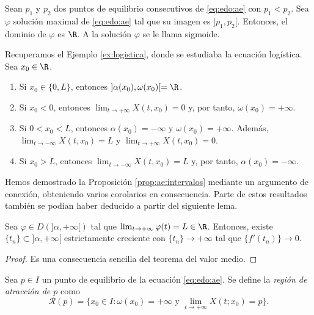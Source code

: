 \documentclass{article}
\begin{document}
\begin{cor}
  Sean $p_1$ y $p_2$ dos puntos de equilibrio consecutivos de \eqref{eq:edo:ae} con $p_1 < p_2$. Sea
  $\varphi$ solución maximal de \eqref{eq:edo:ae} tal que su imagen es $]p_1, p_2[$. Entonces, el
  dominio de $\varphi$ es $\R$. A la solución $\varphi$ se le llama sigmoide.
\end{cor}

\begin{ex} \label{ex:logistica:2} Recuperamos el Ejemplo \ref{ex:logistica},
  donde se estudiaba la ecuación logística. Sea $x_0 \in \R$.
  \begin{enumerate}
  \item Si $x_0 \in \{0, L\}$, entonces $]\alpha(x_0), \omega(x_0)[ = \R$.
  \item Si $x_0 < 0$, entonces $\lim_{t \to +\infty} X(t,x_0) = 0$ y, por tanto,
    $\omega(x_0) = +\infty$.
  \item Si $0 < x_0 < L$, entonces $\alpha(x_0) = -\infty$ y $\omega(x_0) = +\infty$. Además,
    $\lim_{t \to -\infty} X(t,x_0) = L$ y $\lim_{t \to +\infty} X(t,x_0) = 0$.
  \item Si $x_0 > L$, entonces $\lim_{t \to -\infty} X(t,x_0) = L$ y, por tanto,
    $\alpha(x_0) = -\infty$. \qedhere
  \end{enumerate}
\end{ex}

Hemos demostrado la Proposición \ref{prop:ae:intervalos} mediante un argumento de conexión,
obteniendo varios corolarios en consecuencia. Parte de estos resultados también se podían haber
deducido a partir del siguiente lema.

\begin{lemma}
  \label{lem:barbalet}
  Sea $\varphi \in D(]\alpha, +\infty[)$ tal que $\lim_{t \to +\infty} \varphi(t) = L \in
  \R$. Entonces, existe $\{t_n\} \subset ]\alpha, +\infty[$ estrictamente creciente con
  $\{t_n\} \to +\infty$ tal que $\{f'(t_n)\} \to 0$.
\end{lemma}
\begin{proof}
  Es una consecuencia sencilla del teorema del valor medio.
\end{proof}

\begin{definition}
  \label{def:ra}
  Sea $p \in I$ un punto de equilibrio de la ecuación \eqref{eq:edo:ae}. Se define la \emph{región
    de atracción de $p$} como
  \[ \mathcal{R}(p) = \{x_0\in I: \omega(x_0) = +\infty \text{ y } \lim_{t \to +\infty} X(t;x_0) =
    p\}. \]
\end{definition}
\end{document}
